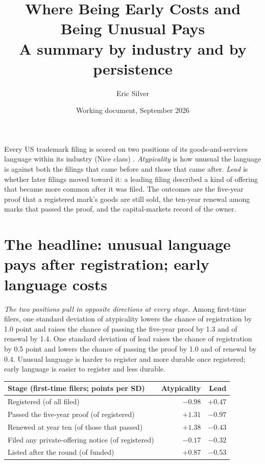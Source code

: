 
\usepackage{longtable}
\usepackage{array}
\graphicspath{{../../}}
\makeatletter{}\makeatother
\title{\bfseries Where Being Early Costs and Being Unusual Pays\\
\large A summary by industry and by persistence}
\author{Eric Silver}
\date{Working document, September 2026}


\maketitle

\noindent Every US trademark filing is scored on two positions of its
goods-and-services language within its industry (Nice class)
\citep{SilverCorpus2026}. \emph{Atypicality} is how unusual the
language is against both the filings that came before and those that
came after. \emph{Lead} is whether later filings moved toward it: a
leading filing described a kind of offering that became more common after
it was filed. The outcomes are the five-year proof that a registered
mark's goods are still sold, the ten-year renewal among marks that passed
the proof, and the capital-markets record of the owner.

\section*{The headline: unusual language pays after registration; early
language costs}

\emph{The two positions pull in opposite directions at every stage.}
Among first-time filers, one standard deviation of atypicality lowers the
chance of registration by 1.0 point and raises the chance of passing the
five-year proof by 1.3 and of renewal by 1.4. One standard deviation of
lead raises the chance of registration by 0.5 point and lowers the chance
of passing the proof by 1.0 and of renewal by 0.4. Unusual language is
harder to register and more durable once registered; early language is
easier to register and less durable.

\begin{center}\small
\begin{tabular}{lrr}
\toprule
Stage (first-time filers; points per SD) & Atypicality & Lead \\
\midrule
Registered (of all filed) & $-0.98$ & $+0.47$ \\
Passed the five-year proof (of registered) & $+1.31$ & $-0.97$ \\
Renewed at year ten (of those that passed) & $+1.38$ & $-0.43$ \\
Filed any private-offering notice (of registered) & $-0.17$ & $-0.32$ \\
Listed after the round (of funded) & $+0.87$ & $-0.53$ \\
\bottomrule
\end{tabular}
\end{center}

